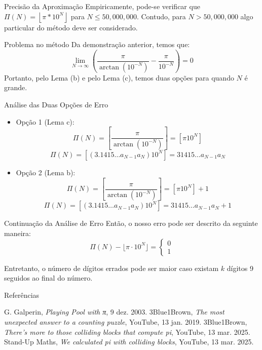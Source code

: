 \documentclass{beamer}
\begin{document}
\begin{frame}{Precisão da Aproximação}
  Empiricamente, pode-se verificar que $\Pi(N) = \left\lfloor\pi*10^N\right\rfloor$ para $N \le 50,000,000$. Contudo, para $N > 50,000,000$ algo particular do método deve ser considerado.
\end{frame}

\begin{frame}{Problema no método}
    Da demonstração anterior, temos que:
  $$
  \lim_{N\to\infty}\left(\frac{\pi}{\arctan(10^{-N})}-\frac{\pi}{10^{-N}}\right)=0
  $$
  Portanto, pelo Lema (b) e pelo Lema (c), temos duas opções para quando $N$ é grande.
\end{frame}

\begin{frame}{Análise das Duas Opções de Erro}
  \begin{itemize}
    \item Opção 1 (Lema c): 
    $$\Pi(N) = \left [ \frac{\pi}{\arctan{(10^{-N})}}\right] = [\pi 10^N]$$
    $$\Pi(N) = [(3.1415\dots a_{N-1} a_{N})10^N]=31415\dots a_{N-1}a_N$$
    \item Opção 2 (Lema b): 
    $$\Pi(N) = \left [ \frac{\pi}{\arctan{(10^{-N})}}\right] = [\pi 10^N]+1$$
    $$\Pi(N) =[(3.1415\dots a_{N-1} a_{N})10^N]=31415\dots a_{N-1}a_N+1$$
  \end{itemize}
\end{frame}

\begin{frame}{Continuação da Análise de Erro}
  Então, o nosso erro pode ser descrito da seguinte maneira:
    \begin{equation*}
        \Pi(N) - \lfloor \pi \cdot 10^N \rfloor = \left\{
        \begin{array}{c}
        0 \\
        1
        \end{array}
        \right.
    \end{equation*}

Entretanto, o número de dígitos errados pode ser maior caso existam $k$ dígitos 9 seguidos ao final do número.
\end{frame}
\begin{frame}[allowframebreaks]{Referências}
  \begin{thebibliography}{}
     G. Galperin, \emph{Playing Pool with π}, 9 dez. 2003.
     3Blue1Brown, \emph{The most unexpected answer to a counting puzzle}, YouTube, 13 jan. 2019.
     3Blue1Brown, \emph{There's more to those colliding blocks that compute pi}, YouTube, 13 mar. 2025.
     Stand-Up Maths, \emph{We calculated pi with colliding blocks}, YouTube, 13 mar. 2025.
  \end{thebibliography}
\end{frame}
\end{document}
